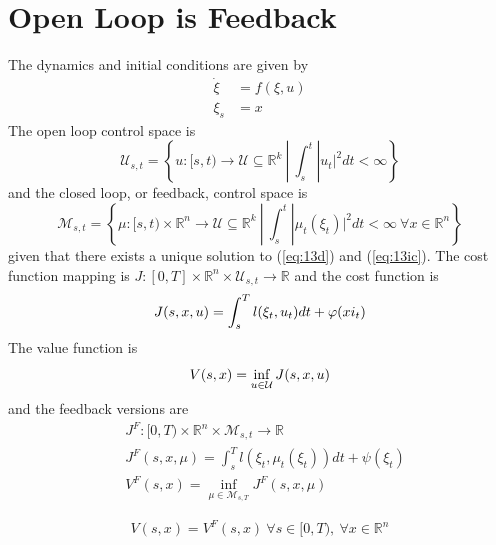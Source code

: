 
\mainmatter
\setcounter{page}{1}

\lectureseries[\course]{\course}

\date{November 12, 2009}

\setaddress

\setcounter{lecture}{12}
\setcounter{chapter}{12}


\section{Open Loop is Feedback}
The dynamics and initial conditions are given by
\begin{align}
\label{eq:13d}
\dot{\xi} &= f(\xi,u) \\
\label{eq:13ic}
\xi_s &= x
\end{align}
The open loop control space is
$$\mathcal{U}_{s,t} = \left\lbrace u:[s,t)\to\mathcal{U}\subseteq \mathbb{R}^k ~|~ \int_s^t |u_t|^2dt < \infty \right\rbrace$$
and the closed loop, or feedback, control space is
$$\mathcal{M}_{s,t} = \left\lbrace \mu:[s,t)\times\mathbb{R}^n\to\mathcal{U}\subseteq\mathbb{R}^k ~|~ \int_s^t |\mu_t(\xi_t)|^2dt < \infty ~\forall x \in \mathbb{R}^n \right\rbrace$$
given that there exists a unique solution to (\ref{eq:13d}) and (\ref{eq:13ic}). The cost function mapping is $J:[0,T]\times\mathbb{R}^n\times\mathcal{U}_{s,t}\to\mathbb{R}$ and the cost function is
\begin{align}
\label{eq:13cost}
J(s,x,u) = \int_s^Tl(\xi_t,u_t)dt + \varphi(xi_t)
\end{align}
The value function is
$$V(s,x) = \inf_{u\in\mathcal{U}}J(s,x,u)$$
and the feedback versions are
\begin{align*}
&J^F: [0,T)\times\mathbb{R}^n\times\mathcal{M}_{s,t}\to\mathbb{R} \\
&J^F(s,x,\mu) = \int_s^Tl(\xi_t,\mu_t(\xi_t))dt + \psi(\xi_t) \\
&V^F(s,x) = \inf_{\mu\in\mathcal{M}_{s,T}}J^F(s,x,\mu)
\end{align*}

\begin{proposition}
\label{prop:13value}
$$V(s,x) = V^F(s,x) ~\forall s\in[0,T), ~\forall x\in\mathbb{R}^n$$
\end{proposition}

